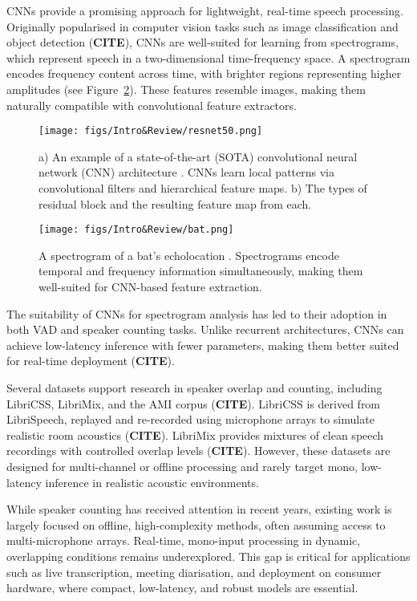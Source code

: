 CNNs provide a promising approach for lightweight, real-time speech processing. Originally popularised in computer vision tasks such as image classification and object detection (\textbf{CITE}), CNNs are well-suited for learning from spectrograms, which represent speech in a two-dimensional time-frequency space. A spectrogram encodes frequency content across time, with brighter regions representing higher amplitudes (see Figure~\ref{fig:bat_spec}). These features resemble images, making them naturally compatible with convolutional feature extractors.


\begin{figure}[H]
\centering
\texttt{[image: figs/Intro\&Review/resnet50.png]}
\caption{a) An example of a state-of-the-art (SOTA) convolutional neural network (CNN) architecture \cite{ResNet50}. CNNs learn local patterns via convolutional filters and hierarchical feature maps. b) The types of residual block and the resulting feature map from each.}
\label{fig:cnn_example}
\end{figure}


\begin{figure}[H]
\centering
\texttt{[image: figs/Intro\&Review/bat.png]}
\caption{A spectrogram of a bat's echolocation \cite{bat_echolocation_jones}. Spectrograms encode temporal and frequency information simultaneously, making them well-suited for CNN-based feature extraction.}
\label{fig:bat_spec}
\end{figure}


The suitability of CNNs for spectrogram analysis has led to their adoption in both VAD and speaker counting tasks. Unlike recurrent architectures, CNNs can achieve low-latency inference with fewer parameters, making them better suited for real-time deployment (\textbf{CITE}).


Several datasets support research in speaker overlap and counting, including LibriCSS, LibriMix, and the AMI corpus (\textbf{CITE}). LibriCSS is derived from LibriSpeech, replayed and re-recorded using microphone arrays to simulate realistic room acoustics (\textbf{CITE}). LibriMix provides mixtures of clean speech recordings with controlled overlap levels (\textbf{CITE}). However, these datasets are designed for multi-channel or offline processing and rarely target mono, low-latency inference in realistic acoustic environments.


While speaker counting has received attention in recent years, existing work is largely focused on offline, high-complexity methods, often assuming access to multi-microphone arrays. Real-time, mono-input processing in dynamic, overlapping conditions remains underexplored. This gap is critical for applications such as live transcription, meeting diarisation, and deployment on consumer hardware, where compact, low-latency, and robust models are essential.



